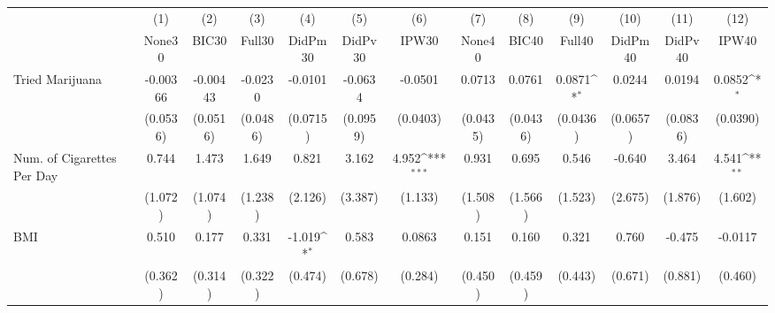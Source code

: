 {
\def\sym#1{\ifmmode^{#1}\else\(^{#1}\)\fi}
\begin{tabular}{l*{12}{c}}
\toprule
            &\multicolumn{1}{c}{(1)}&\multicolumn{1}{c}{(2)}&\multicolumn{1}{c}{(3)}&\multicolumn{1}{c}{(4)}&\multicolumn{1}{c}{(5)}&\multicolumn{1}{c}{(6)}&\multicolumn{1}{c}{(7)}&\multicolumn{1}{c}{(8)}&\multicolumn{1}{c}{(9)}&\multicolumn{1}{c}{(10)}&\multicolumn{1}{c}{(11)}&\multicolumn{1}{c}{(12)}\\
            &\multicolumn{1}{c}{None30}&\multicolumn{1}{c}{BIC30}&\multicolumn{1}{c}{Full30}&\multicolumn{1}{c}{DidPm30}&\multicolumn{1}{c}{DidPv30}&\multicolumn{1}{c}{IPW30}&\multicolumn{1}{c}{None40}&\multicolumn{1}{c}{BIC40}&\multicolumn{1}{c}{Full40}&\multicolumn{1}{c}{DidPm40}&\multicolumn{1}{c}{DidPv40}&\multicolumn{1}{c}{IPW40}\\
\midrule
Tried Marijuana&    -0.00366         &    -0.00443         &     -0.0230         &     -0.0101         &     -0.0634         &     -0.0501         &      0.0713         &      0.0761         &      0.0871\sym{*}  &      0.0244         &      0.0194         &      0.0852\sym{*}  \\
            &    (0.0536)         &    (0.0516)         &    (0.0486)         &    (0.0715)         &    (0.0959)         &    (0.0403)         &    (0.0435)         &    (0.0436)         &    (0.0436)         &    (0.0657)         &    (0.0836)         &    (0.0390)         \\
\addlinespace
Num. of Cigarettes Per Day&       0.744         &       1.473         &       1.649         &       0.821         &       3.162         &       4.952\sym{***}&       0.931         &       0.695         &       0.546         &      -0.640         &       3.464         &       4.541\sym{**} \\
            &     (1.072)         &     (1.074)         &     (1.238)         &     (2.126)         &     (3.387)         &     (1.133)         &     (1.508)         &     (1.566)         &     (1.523)         &     (2.675)         &     (1.876)         &     (1.602)         \\
\addlinespace
BMI         &       0.510         &       0.177         &       0.331         &      -1.019\sym{*}  &       0.583         &      0.0863         &       0.151         &       0.160         &       0.321         &       0.760         &      -0.475         &     -0.0117         \\
            &     (0.362)         &     (0.314)         &     (0.322)         &     (0.474)         &     (0.678)         &     (0.284)         &     (0.450)         &     (0.459)         &     (0.443)         &     (0.671)         &     (0.881)         &     (0.460)         \\

\end{tabular}}
